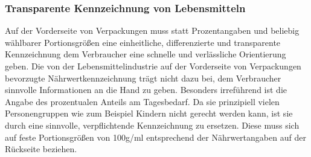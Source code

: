 \subsubsection{Transparente Kennzeichnung von Lebensmitteln}
\abstimmung
Auf der Vorderseite von Verpackungen muss statt Prozentangaben und beliebig wählbarer Portionsgrößen eine einheitliche, differenzierte und transparente Kennzeichnung dem Verbraucher eine schnelle und verlässliche Orientierung geben. Die von der Lebensmittelindustrie auf der Vorderseite von Verpackungen bevorzugte Nährwertkennzeichnung trägt nicht dazu bei, dem Verbraucher sinnvolle Informationen an die Hand zu geben. Besonders irreführend ist die Angabe des prozentualen Anteils am Tagesbedarf. Da sie prinzipiell vielen Personengruppen wie zum Beispiel Kindern nicht gerecht werden kann, ist sie durch eine sinnvolle, verpflichtende Kennzeichnung zu ersetzen. Diese muss sich auf feste Portionsgrößen von 100g/ml entsprechend der Nährwertangaben auf der Rückseite beziehen.
